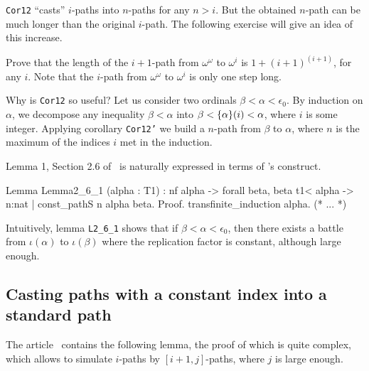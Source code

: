 




\begin{remark}
 \texttt{Cor12} ``casts'' $i$-paths into $n$-paths for any $n>i$.
But the obtained $n$-path can be much longer than the original $i$-path.
The following exercise will give an idea of this increase. 
\end{remark}

\begin{exercise}
  Prove that  the length of the $i+1$-path from
  $\omega^\omega$ to $\omega^i$ is $1 + (i+1)^{(i+1)}$, for any $i$. Note that the $i$-path from
  $\omega^\omega$ to $\omega^i$ is only one step long.
 \end{exercise}


Why is \texttt{Cor12} so useful? 
Let us  consider two ordinals  $\beta<\alpha<\epsilon_0$. By induction on $\alpha$,
we decompose any inequality $\beta<\alpha$ into $\beta < \mbox{$\{\alpha\}(i)$}< \alpha$, where $i$ is some integer. Applying corollary \texttt{Cor12'} we build a $n$-path from $\beta$ to $\alpha$,
where $n$ is the maximum of the indices $i$ met in the induction.

 Lemma 1, Section 2.6 of~\cite{KS81} is naturally expressed in terms of \coq's
\verb@sig@ construct.

\label{lemma:L-2_6-1}

\begin{Coqsrc}
Lemma Lemma2_6_1 (alpha : T1) :  
  nf alpha -> forall beta,  beta t1< alpha  ->
  {n:nat | const_pathS n alpha beta}.
Proof.
  transfinite_induction alpha.
  (* ... *)
\end{Coqsrc}



Intuitively, lemma   \texttt{L2\_6\_1}  shows that if $\beta<\alpha<\epsilon_0$, then there exists  a battle from $\iota(\alpha)$ to $\iota(\beta)$ where the replication factor is constant, although large enough. 







\subsection{Casting paths with a constant index into a standard path}


The article~\cite{KS81} contains 
the following lemma, the proof of which is quite complex, which allows to simulate $i$-paths by $[i+1,j]$-paths, where $j$ is large enough.


